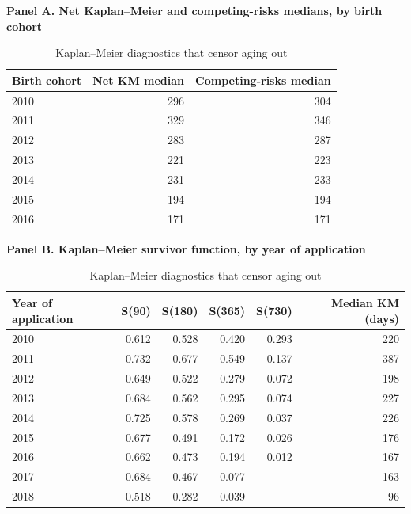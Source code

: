 \begin{table}[htbp]\centering
\caption{Kaplan--Meier diagnostics that censor aging out}
\label{tab:E1d}
\label{tab:R2b_km}
\footnotesize
\par\medskip\textbf{Panel A. Net Kaplan--Meier and competing-risks medians, by birth cohort}\par\smallskip
\begin{tabular}{lrr}
\toprule
Birth cohort & Net KM median & Competing-risks median \\
\midrule
2010 & 296 & 304 \\
2011 & 329 & 346 \\
2012 & 283 & 287 \\
2013 & 221 & 223 \\
2014 & 231 & 233 \\
2015 & 194 & 194 \\
2016 & 171 & 171 \\
\bottomrule
\end{tabular}
\par\medskip\textbf{Panel B. Kaplan--Meier survivor function, by year of application}\par\smallskip
\begin{tabular}{lrrrrr}
\toprule
Year of application & S(90) & S(180) & S(365) & S(730) & Median KM (days) \\
\midrule
2010 & 0.612 & 0.528 & 0.420 & 0.293 & 220 \\
2011 & 0.732 & 0.677 & 0.549 & 0.137 & 387 \\
2012 & 0.649 & 0.522 & 0.279 & 0.072 & 198 \\
2013 & 0.684 & 0.562 & 0.295 & 0.074 & 227 \\
2014 & 0.725 & 0.578 & 0.269 & 0.037 & 226 \\
2015 & 0.677 & 0.491 & 0.172 & 0.026 & 176 \\
2016 & 0.662 & 0.473 & 0.194 & 0.012 & 167 \\
2017 & 0.684 & 0.467 & 0.077 &  & 163 \\
2018 & 0.518 & 0.282 & 0.039 &  & 96 \\
\bottomrule
\end{tabular}
\end{table}
